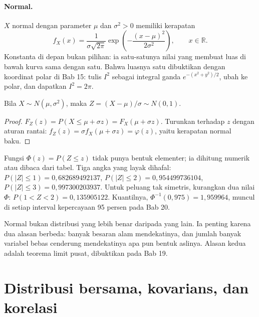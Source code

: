 \paragraph{Normal.} $X$ normal dengan parameter $\mu$ dan $\sigma^2>0$ memiliki
kerapatan
\[
f_X(x)=\frac{1}{\sigma\sqrt{2\pi}}
\exp\!\left(-\frac{(x-\mu)^2}{2\sigma^2}\right),\qquad x\in\mathbb{R}.
\]
Konstanta di depan bukan pilihan: ia satu-satunya nilai yang membuat luas di bawah
kurva sama dengan satu. Bahwa luasnya satu dibuktikan dengan koordinat polar di Bab 15:
tulis $I^2$ sebagai integral ganda $e^{-(x^2+y^2)/2}$, ubah ke polar, dan dapatkan
$I^2=2\pi$.

\begin{proposisi}
Bila $X\sim N(\mu,\sigma^2)$, maka $Z=(X-\mu)/\sigma\sim N(0,1)$.
\end{proposisi}

\begin{proof}
$F_Z(z)=P(X\le\mu+\sigma z)=F_X(\mu+\sigma z)$. Turunkan terhadap $z$ dengan aturan
rantai: $f_Z(z)=\sigma f_X(\mu+\sigma z)=\varphi(z)$, yaitu kerapatan normal baku.
\end{proof}

Fungsi $\Phi(z)=P(Z\le z)$ tidak punya bentuk elementer; ia dihitung numerik atau
dibaca dari tabel. Tiga angka yang layak dihafal: $P(|Z|\le1)=0{,}682689492137$,
$P(|Z|\le2)=0{,}954499736104$, $P(|Z|\le3)=0{,}997300203937$. Untuk peluang tak
simetris, kurangkan dua nilai $\Phi$: $P(1<Z<2)=0{,}135905122$. Kuantilnya,
$\Phi^{-1}(0{,}975)=1{,}959964$, muncul di setiap interval kepercayaan 95 persen pada
Bab 20.

Normal bukan distribusi yang lebih benar daripada yang lain. Ia penting karena dua
alasan berbeda: banyak besaran alam mendekatinya, dan jumlah banyak variabel bebas
cenderung mendekatinya apa pun bentuk aslinya. Alasan kedua adalah teorema limit
pusat, dibuktikan pada Bab 19.



\section{Distribusi bersama, kovarians, dan korelasi}

